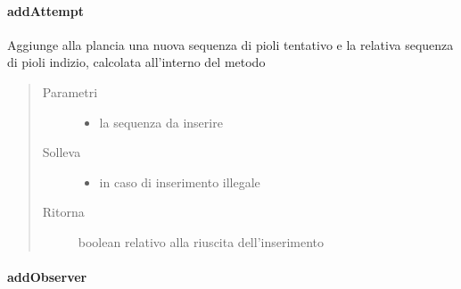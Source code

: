 \documentclass[letterpaper,10pt,italian,openany,oneside]{sphinxmanual}
\begin{document}
\paragraph{addAttempt}
\label{\detokenize{source/it/unicam/cs/pa/mastermind/gamecore/BoardModel:addattempt}}

\begin{fulllineitems}
\label{\detokenize{source/it/unicam/cs/pa/mastermind/gamecore/BoardModel:it.unicam.cs.pa.mastermind.gamecore.BoardModel.addAttempt(List)}}
Aggiunge alla plancia una nuova sequenza di pioli tentativo e la relativa sequenza di pioli indizio, calcolata all’interno del metodo
\begin{quote}\begin{description}
\item[{Parametri}] \leavevmode\begin{itemize}
\item {} 
 \textendash{} la sequenza da inserire

\end{itemize}

\item[{Solleva}] \leavevmode\begin{itemize}
\item {} 
 \textendash{} in caso di inserimento illegale

\end{itemize}

\item[{Ritorna}] \leavevmode
boolean relativo alla riuscita dell’inserimento

\end{description}\end{quote}

\end{fulllineitems}



\paragraph{addObserver}
\label{\detokenize{source/it/unicam/cs/pa/mastermind/gamecore/BoardModel:addobserver}}
\end{document}
